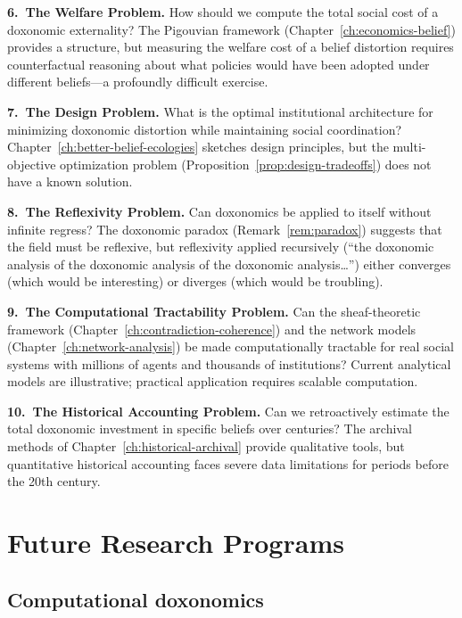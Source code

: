 \begin{conjecture}
\medskip\noindent\textbf{6.\ The Welfare Problem.}
How should we compute the total social cost of a doxonomic externality?
The Pigouvian framework (Chapter~\ref{ch:economics-belief}) provides a structure, but measuring the welfare cost of a belief distortion requires counterfactual reasoning about what policies would have been adopted under different beliefs---a profoundly difficult exercise.

\medskip\noindent\textbf{7.\ The Design Problem.}
What is the optimal institutional architecture for minimizing doxonomic distortion while maintaining social coordination?
Chapter~\ref{ch:better-belief-ecologies} sketches design principles, but the multi-objective optimization problem (Proposition~\ref{prop:design-tradeoffs}) does not have a known solution.

\medskip\noindent\textbf{8.\ The Reflexivity Problem.}
Can doxonomics be applied to itself without infinite regress?
The doxonomic paradox (Remark~\ref{rem:paradox}) suggests that the field must be reflexive, but reflexivity applied recursively (``the doxonomic analysis of the doxonomic analysis of the doxonomic analysis\ldots'') either converges (which would be interesting) or diverges (which would be troubling).

\medskip\noindent\textbf{9.\ The Computational Tractability Problem.}
Can the sheaf-theoretic framework (Chapter~\ref{ch:contradiction-coherence}) and the network models (Chapter~\ref{ch:network-analysis}) be made computationally tractable for real social systems with millions of agents and thousands of institutions?
Current analytical models are illustrative; practical application requires scalable computation.

\medskip\noindent\textbf{10.\ The Historical Accounting Problem.}
Can we retroactively estimate the total doxonomic investment in specific beliefs over centuries?
The archival methods of Chapter~\ref{ch:historical-archival} provide qualitative tools, but quantitative historical accounting faces severe data limitations for periods before the 20th century.
\end{conjecture}

\section{Future Research Programs}
\label{sec:ch35-future}

\subsection{Computational doxonomics}

